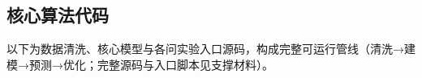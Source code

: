 \documentclass[withoutpreface,bwprint]{cumcmthesis}
\begin{document}
\begin{appendices}
\section{核心算法代码}
以下为数据清洗、核心模型与各问实验入口源码，构成完整可运行管线（清洗→建模→预测→优化；完整源码与入口脚本见支撑材料）。










\end{appendices}
\end{document}

